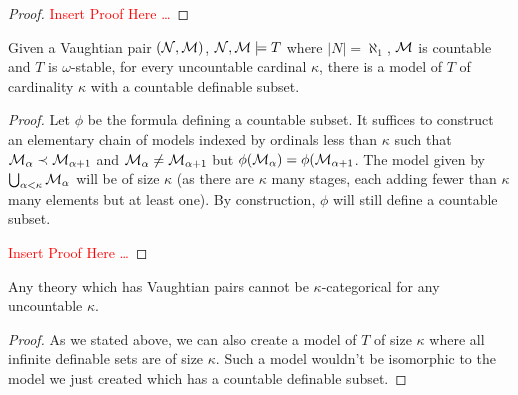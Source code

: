 \begin{proof}

\textcolor{red}{Insert Proof Here \ldots}
\end{proof}

\begin{theorem}\label{theorem_uncountable_vaightian_pairs}
Given a Vaughtian pair \((\mathcal{N}, \mathcal{M})\), \(\mathcal{N}, \mathcal{M} \models T\) where \(|N| = \aleph_1\), \(\mathcal{M}\) is countable and \(T\) is \(\omega\)-stable, for every uncountable cardinal \(\kappa\), there is a model of \(T\) of cardinality \(\kappa\) with a countable definable subset.  
\end{theorem}

\begin{proof}
Let \(\phi\) be the formula defining a countable subset. 
It suffices to construct an elementary chain of models indexed by ordinals less than \(\kappa\) such that \(\mathcal{M}_\alpha \prec \mathcal{M}_{\alpha+1}\) and \(\mathcal{M}_\alpha \neq \mathcal{M}_{\alpha+1}\) but \(\phi(\mathcal{M}_\alpha) = \phi(\mathcal{M}_{\alpha+1}\). 
The model given by \(\bigcup_{\alpha<\kappa} \mathcal{M}_\alpha\) will be of size \(\kappa\) (as there are \(\kappa\) many stages, each adding fewer than \(\kappa\) many elements but at least one).
By construction, \(\phi\) will still define a countable subset. 

\textcolor{red}{Insert Proof Here \ldots} 
\end{proof}

\begin{theorem}\label{theorem_vaughtian_pairs_categoricity}
Any theory which has Vaughtian pairs cannot be \(\kappa\)-categorical for any uncountable \(\kappa\).
\end{theorem}

\begin{proof}
As we stated above, we can also create a model of \(T\) of size \(\kappa\) where all infinite definable sets are of size \(\kappa\). 
Such a model wouldn't be isomorphic to the model we just created which has a countable definable subset. 
\end{proof}
